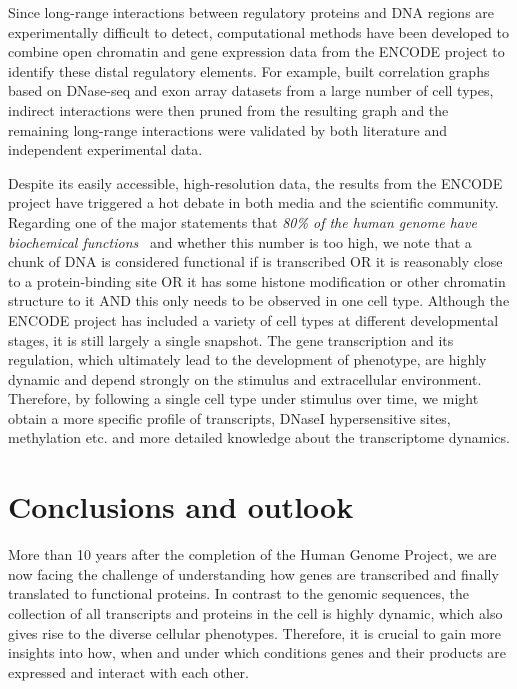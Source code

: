 Since long-range interactions between regulatory proteins
and DNA regions are experimentally difficult to detect,
computational methods have been developed to combine 
open chromatin and gene expression data from the ENCODE
project to identify these distal regulatory elements. 
For example, \cite{Demeyer2014} built correlation graphs 
based on DNase-seq and exon array datasets from a large 
number of cell types, indirect interactions were then pruned
from the resulting graph and the remaining long-range
interactions were validated by both literature and 
independent experimental data.

Despite its easily accessible, high-resolution data,
the results from the ENCODE project have triggered a hot
debate in both media and the scientific community.
Regarding one of the major statements that \emph{80\% of 
the human genome have biochemical functions}~%
\citep{ENCODE2012} and whether this number is too high, 
we note that a chunk of DNA is considered functional if is transcribed OR it is reasonably close to a protein-binding site OR it has some histone modification or other chromatin structure to it AND this only needs to be observed in one cell type. Although the ENCODE project has included
a variety of cell types at different developmental stages, 
it is still largely a single snapshot. The gene transcription
and its regulation, which ultimately lead to the development
of phenotype, are highly dynamic and depend strongly on the 
stimulus and extracellular environment. Therefore, 
by following a single cell type under stimulus over time,
we might
obtain a more specific profile of transcripts, DNaseI
hypersensitive sites, methylation etc. and more detailed
knowledge about the transcriptome dynamics.

\chapter{Conclusions and outlook}
More than 10 years after the completion of the Human Genome
Project, we are now facing the challenge of understanding 
how genes are transcribed and finally translated to functional
proteins. In contrast to the genomic sequences, the collection
of all transcripts and proteins 
in the cell is highly dynamic, which also
gives rise to the diverse cellular phenotypes. Therefore, it
is crucial to gain more insights into 
how, when and under which conditions 
genes and their products 
are expressed and interact with each other.

